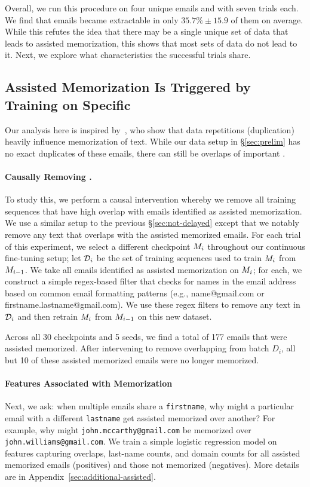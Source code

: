 Overall, we run this procedure on four unique emails and with seven trials each. We find that emails became extractable in only $35.7\%\pm15.9$ of them on average. While this refutes the idea that there may be a single unique set of data that leads to assisted memorization, this shows that most sets of data do not lead to it. Next, we explore what characteristics the successful trials share.


\subsection{Assisted Memorization Is Triggered by Training on Specific \ngrams}
\label{section:sub_assisted}
Our analysis here is inspired by~\citet{lee-etal-2022-deduplicating}, who show that data repetitions (duplication) heavily influence memorization of text. While our data setup in \S\ref{sec:prelim} has no exact duplicates of these emails, there can still be overlaps of important \ngrams.

\paragraph{Causally Removing \ngrams.}
To study this, we perform a causal intervention whereby we remove all training sequences that have high \ngram overlap with emails identified as assisted memorization. We use a similar setup to the previous \S\ref{sec:not-delayed} except that we notably remove any text that overlaps with the assisted memorized emails. For each trial of this experiment, we select a different checkpoint $M_i$ throughout our continuous fine-tuning setup; let $\mathcal{D}_i$ be the set of training sequences used to train $M_i$ from $M_{i-1}$. We take all emails identified as assisted memorization on $M_i$; for each, we construct a simple regex-based filter that checks for names in the email address based on common email formatting patterns (e.g., name@gmail.com or firstname.lastname@gmail.com). We use these regex filters to remove any text in $\mathcal{D}_i$ and then retrain $M_i$ from $M_{i-1}$ on this new dataset. 

Across all 30 checkpoints and 5 seeds, we find a total of 177 emails that were assisted memorized. After intervening to remove overlapping \ngrams from batch $D_{i}$, all but 10 of these assisted memorized emails were no longer memorized. 


\paragraph{Features Associated with Memorization} Next, we ask: when multiple emails share a \texttt{firstname}, why might a particular email with a different \texttt{lastname} get assisted memorized over another? For example, why might \texttt{john.mccarthy@gmail.com} be memorized over \texttt{john.williams@gmail.com}. We train a simple logistic regression model on features capturing \ngrams overlaps, last-name counts, and domain counts for all assisted memorized emails (positives) and those not memorized (negatives). More details are in Appendix~\ref{sec:additional-assisted}. 



